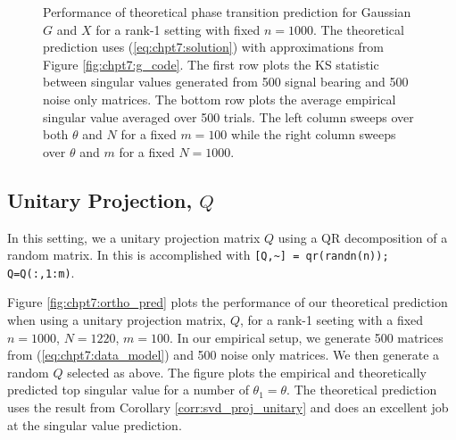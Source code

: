 \begin{figure}
\begin{center}
{  }
  \caption{Performance of theoretical phase transition prediction for Gaussian $G$ and $X$
    for a rank-1 setting with fixed $n=1000$. The theoretical prediction uses
    (\ref{eq:chpt7:solution}) with approximations from Figure \ref{fig:chpt7:g_code}. The
    first row plots the KS statistic between singular values generated from 500 signal
    bearing and 500 noise only matrices. The bottom row plots the average empirical
    singular value averaged over 500 trials. The left column sweeps over both $\theta$ and
    $N$ for a fixed $m=100$ while the right column sweeps over $\theta$ and $m$ for a
    fixed $N=1000$.}
  \label{fig:chpt7:gauss}
\end{center}
\end{figure}

\subsection{Unitary Projection, $Q$}

In this setting, we a unitary projection matrix $Q$ using a QR decomposition of a random
matrix. In {} this is accomplished with 
\be 
\texttt{[Q,\textasciitilde] = qr(randn(n)); Q=Q(:,1:m)}.
\ee

Figure \ref{fig:chpt7:ortho_pred} plots the performance of our theoretical prediction when
using a unitary projection matrix, $Q$, for a rank-1 seeting with a fixed $n=1000$,
$N=1220$, $m=100$. In our empirical setup, we generate 500 matrices from
(\ref{eq:chpt7:data_model}) and 500 noise only matrices. We then generate a random $Q$
selected as above. The figure plots the empirical and theoretically predicted top singular
value for a number of $\theta_1=\theta$. The theoretical prediction uses the result from
Corollary \ref{corr:svd_proj_unitary} and does an excellent job at the singular value
prediction. 

